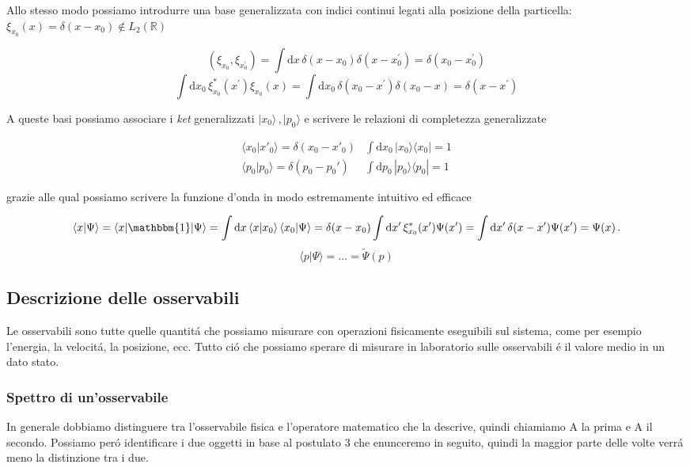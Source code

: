 Allo stesso modo possiamo introdurre una base generalizzata con indici continui legati alla posizione della particella: $\xi_{x_0} (x) = \delta(x − x_0) \notin L_2(\mathbb{R})$

$$(\xi_{x_{0}},\xi_{x_{0}^{\prime}})=\int\mathrm{d}x\,\delta(x-x_{0})\delta(x-x_{0}^{\prime})=\delta(x_{0}-x_{0}^{\prime})$$
$$\int\mathrm{d}x_{0}\,\xi_{x_{0}}^{*}(x^{\prime})\xi_{x_{0}}(x)=\int\mathrm{d}x_{0}\,\delta(x_{0}-x^{\prime})\delta(x_{0}-x)=\delta(x-x^{\prime})$$  

A queste basi possiamo associare i \textit{ket} generalizzati $|x_{0}\rangle\,,|p_{0}\rangle$ e scrivere le relazioni di completezza generalizzate 

$$\begin{matrix}\langle x_0|x'_0\rangle=\delta(x_0-x'_0)&\int\mathrm{d}x_0\,|x_0\rangle\langle x_0|=1\\ \langle p_0|p_0\rangle=\delta(p_0-p_0')&\int\mathrm{d}p_0\,|p_0\rangle\langle p_0|=1\end{matrix}$$ 

grazie alle qual possiamo scrivere la funzione d'onda in modo estremamente intuitivo ed efficace
 
$$\langle x|\Psi\rangle=\langle x|\mathbbm{1}|\Psi\rangle=\int\mathrm{d}x\,\langle x|x_{0}\rangle\,\langle x_{0}|\Psi\rangle=\delta(x-x_{0})\int\mathrm{d}x^{\prime}\,\xi_{x_{0}}^{*}(x^{\prime})\Psi(x^{\prime})=\int\mathrm{d}x^{\prime}\,\delta(x-x^{\prime})\Psi(x^{\prime})=\Psi(x)\,.$$
$$\langle p|\Psi\rangle=\ldots={\tilde{\Psi}}(p)$$

\subsection{Descrizione delle osservabili}

Le osservabili sono tutte quelle quantit\'a che possiamo misurare con operazioni fisicamente eseguibili sul sistema, come per esempio l'energia, la velocit\'a, la posizione, ecc. Tutto ci\'o che possiamo sperare di misurare in laboratorio sulle osservabili \'e il valore medio in un dato stato.

\subsubsection{Spettro di un'osservabile}

In generale dobbiamo distinguere tra l'osservabile fisica e l'operatore matematico che la descrive, quindi chiamiamo A la prima e A il secondo. Possiamo per\'o identificare i due oggetti in base al postulato 3 che enunceremo in seguito, quindi la maggior parte delle volte verr\'a meno la distinzione tra i due.

